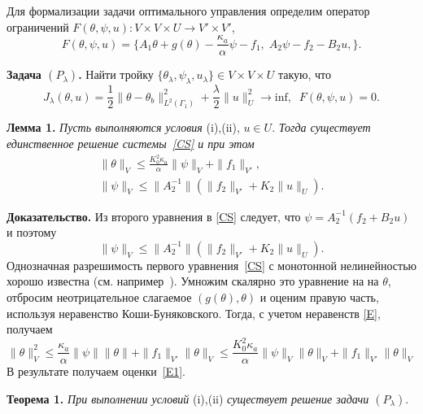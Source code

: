 Для формализации задачи оптимального управления
определим оператор
ограничений $F(\theta, \psi, u) : V \times V \times U \rightarrow V' \times V'$,
\[
    F(\theta, \psi, u) = \{A_1\theta+g(\theta)-\frac{\kappa_a}{\alpha}\psi-f_1 ,\;
    A_2\psi-f_2-B_2u, \}.
\]


\textbf{Задача $(P_\lambda)$.} Найти тройку $\{\theta_\lambda, \psi_\lambda, u_\lambda \} \in V \times V \times U$
такую, что
\begin{equation}
    \label{CP}
    J_\lambda(\theta, u) = \frac{1}{2}\|\theta -\theta_b\|^2_{L^2(\Gamma_1)}
    + \frac{\lambda}{2}\|u\|^2_U \rightarrow \text{inf},\;\; F(\theta, \psi, u)=0.
\end{equation}

\textbf{Лемма 1.}
\textit{
    Пусть выполняются условия} (i),(ii), $u\in U$. \textit{ Тогда
существует единственное решение системы~\eqref{CS} и при этом}
\begin{equation}
    \label{E1}
    \begin{aligned}
        \|\theta\|_V \leq
        \frac{K_0^2\kappa_a}{\alpha}\|\psi\|_V+\|f_1\|_{V'}, \\
        \|\psi\|_V\leq \|A_2^{-1}\|\left(\|f_2\|_{V'}+K_2\|u\|_U\right).
    \end{aligned}
\end{equation}

\textbf{ Доказательство.}
Из второго уравнения в \eqref{CS} следует, что $\psi=A_2^{-1}(f_2+B_2u)$  и поэтому
$$
\|\psi\|_V\leq \|A_2^{-1}\|\left(\|f_2\|_{V'}+K_2\|u\|_U\right).
$$
Однозначная разрешимость первого уравнения~\eqref{CS} с монотонной нелинейностью хорошо известна (см.
например~\cite{Kufner}). Умножим скалярно это уравнение на
на $\theta $, отбросим неотрицательное
слагаемое $(g(\theta),\theta)$ и оценим правую часть, используя неравенство Коши-Буняковского.
Тогда, с учетом неравенств \eqref{E}, получаем
\[
    \|\theta\|^2_V \leq \frac{\kappa_a}{\alpha}\|\psi\|\|\theta\|+\|f_1\|_{V'}\|\theta\|_V\leq
    \frac{K_0^2\kappa_a}{\alpha}\|\psi\|_V\|\theta\|_V+\|f_1\|_{V'}\|\theta\|_V
\]
В результате получаем оценки~\eqref{E1}.

\textbf{Теорема 1.}
\textit{
    При выполнении условий} (i),(ii)
\textit{ существует решение задачи $(P_\lambda).$
}

